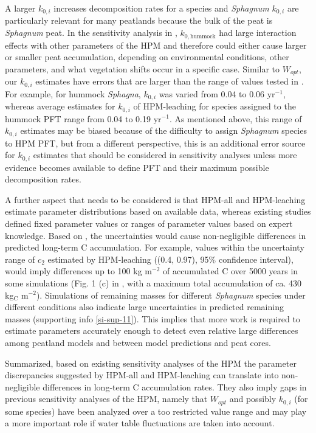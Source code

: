 \documentclass[esd, manuscript]{copernicus}
\begin{document}
A larger \(k_{0,i}\) increases decomposition rates for a species and \emph{Sphagnum} \(k_{0,i}\) are particularly relevant for many peatlands because the bulk of the peat is \emph{Sphagnum} peat. In the sensitivity analysis in \citet{Quillet.2013a}, \(k_{0, \text{hummock}}\) had large interaction effects with other parameters of the HPM and therefore could either cause larger or smaller peat accumulation, depending on environmental conditions, other parameters, and what vegetation shifts occur in a specific case. Similar to \(W_{opt}\), our \(k_{0,i}\) estimates have errors that are larger than the range of values tested in \citet{Quillet.2013a}. For example, for hummock \emph{Sphagna}, \(k_{0,i}\) was varied from 0.04 to 0.06 yr\(^{-1}\), whereas average estimates for \(k_{0,i}\) of HPM-leaching for species assigned to the hummock PFT range from 0.04 to 0.19 yr\(^{-1}\). As mentioned above, this range of \(k_{0,i}\) estimates may be biased because of the difficulty to assign \emph{Sphagnum} species to HPM PFT, but from a different perspective, this is an additional error source for \(k_{0,i}\) estimates that should be considered in sensitivity analyses unless more evidence becomes available to define PFT and their maximum possible decomposition rates.

A further aspect that needs to be considered is that HPM-all and HPM-leaching estimate parameter distributions based on available data, whereas existing studies defined fixed parameter values or ranges of parameter values based on expert knowledge. Based on \citet{Quillet.2013}, the uncertainties would cause non-negligible differences in predicted long-term C accumulation. For example, values within the uncertainty range of \(c_2\) estimated by HPM-leaching ((0.4, 0.97), 95\% confidence interval), would imply differences up to 100 kg m\(^{-2}\) of accumulated C over 5000 years in some simulations (Fig. 1 (c) in \citet{Quillet.2013}, with a maximum total accumulation of ca. 430 kg\(_\text{C}\) m\(^{-2}\)). Simulations of remaining masses for different \emph{Sphagnum} species under different conditions also indicate large uncertainties in predicted remaining masses (supporting info \ref{si-sup-11}). This implies that more work is required to estimate parameters accurately enough to detect even relative large differences among peatland models and between model predictions and peat cores.

Summarized, based on existing sensitivity analyses of the HPM the parameter discrepancies suggested by HPM-all and HPM-leaching can translate into non-negligible differences in long-term C accumulation rates. They also imply gaps in previous sensitivity analyses of the HPM, namely that \(W_{opt}\) and possibly \(k_{0,i}\) (for some species) have been analyzed over a too restricted value range and may play a more important role if water table fluctuations are taken into account.
\end{document}
